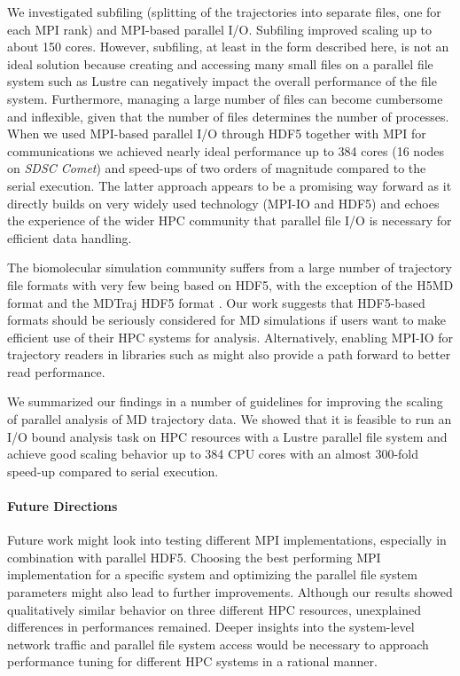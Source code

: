 We investigated subfiling (splitting of the trajectories into separate files, one for each MPI rank) and MPI-based parallel I/O.
Subfiling improved scaling up to about 150 cores.
However, subfiling, at least in the form described here, is not an ideal solution because creating and accessing many small files on a parallel file system such as Lustre can negatively impact the overall performance of the file system.
Furthermore, managing a large number of files can become cumbersome and inflexible, given that the number of files determines the number of processes.
When we used MPI-based parallel I/O through HDF5 together with MPI for communications we achieved nearly ideal performance up to 384 cores (16 nodes on \emph{SDSC Comet}) and speed-ups of two orders of magnitude compared to the serial execution.
The latter approach appears to be a promising way forward as it directly builds on very widely used technology (MPI-IO and HDF5) and echoes the experience of the wider HPC community that parallel file I/O is necessary for efficient data handling.

The biomolecular simulation community suffers from a large number of trajectory file formats with very few being based on HDF5, with the exception of the H5MD format \cite{Buyl:2014aa} and the MDTraj HDF5 format \cite{McGibbon:2015aa}.
Our work suggests that HDF5-based formats should be seriously considered for MD simulations if users want to make efficient use of their HPC systems for analysis. 
Alternatively, enabling MPI-IO for trajectory readers in libraries such as  might also provide a path forward to better read performance.

We summarized our findings in a number of guidelines for improving the scaling of parallel analysis of MD trajectory data.
We showed that it is feasible to run an I/O bound analysis task on HPC resources with a Lustre parallel file system and achieve good scaling behavior up to 384 CPU cores with an almost 300-fold speed-up compared to serial execution.

\paragraph{Future Directions}

Future work might look into testing different MPI implementations, especially in combination with parallel HDF5.
Choosing the best performing MPI implementation for a specific system and optimizing the parallel file system parameters might also lead to further improvements.
Although our results showed qualitatively similar behavior on three different HPC resources, unexplained differences in performances remained.
Deeper insights into the system-level network traffic and parallel file system access would be necessary to approach performance tuning for different HPC systems in a rational manner.

